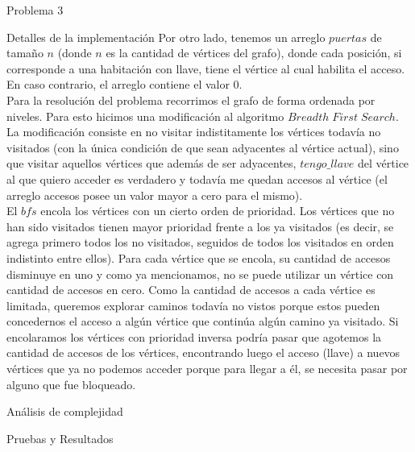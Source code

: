 \begin{section}{Problema 3}
\begin{subsection}{Detalles de la implementación}
		Por otro lado, tenemos un arreglo $puertas$ de tamaño $n$ (donde $n$ es la cantidad de vértices del grafo), donde cada posición, si corresponde a una habitación con llave, tiene el vértice al cual habilita el acceso. En caso contrario, el arreglo contiene el valor $0$.\\

		Para la resolución del problema recorrimos el grafo de forma ordenada por niveles. Para esto hicimos una modificación al algoritmo $Breadth\; First\; Search$. La modificación consiste en no visitar indistitamente los vértices todavía no visitados (con la única condición de que sean adyacentes al vértice actual), sino que visitar aquellos vértices que además de ser adyacentes, $tengo\_llave$ del vértice al que quiero acceder es verdadero y todavía me quedan accesos al vértice (el arreglo accesos posee un valor mayor a cero para el mismo).\\

		El $bfs$ encola los vértices con un cierto orden de prioridad. Los vértices que no han sido visitados tienen mayor prioridad frente a los ya visitados (es decir, se agrega primero todos los no visitados, seguidos de todos los visitados en orden indistinto entre ellos). Para cada vértice que se encola, su cantidad de accesos disminuye en uno y como ya mencionamos, no se puede utilizar un vértice con cantidad de accesos en cero. Como la cantidad de accesos a cada vértice es limitada, queremos explorar caminos todavía no vistos porque estos pueden concedernos el acceso a algún vértice que continúa algún camino ya visitado. Si encolaramos los vértices con prioridad inversa podría pasar que agotemos la cantidad de accesos de los vértices, encontrando luego el acceso (llave) a nuevos vértices que ya no podemos acceder porque para llegar a él, se necesita pasar por alguno que fue bloqueado.\\

	\end{subsection}


	\begin{subsection}{Análisis de complejidad}
		
	\end{subsection}


	\begin{subsection}{Pruebas y Resultados}

	\end{subsection}

\end{section}

